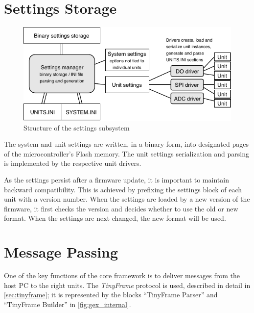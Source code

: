 \section{Settings Storage} \label{sec:settings_storage}

\begin{figure}[h]
	\centering
	\includegraphics[scale=1.2] {img/settings-storage.pdf}
	\caption{\label{fig:settings_storage}Structure of the settings subsystem}
\end{figure}

The system and unit settings are written, in a binary form, into designated pages of the microcontroller's Flash memory. The unit settings serialization and parsing is implemented by the respective unit drivers.

As the settings persist after a firmware update, it is important to maintain backward compatibility. This is achieved by prefixing the settings block of each unit with a version number. When the settings are loaded by a new version of the firmware, it first checks the version and decides whether to use the old or new format. When the settings are next changed, the new format will be used.

%


\section{Message Passing} \label{sec:message_passing}

One of the key functions of the core framework is to deliver messages from the host \gls{PC} to the right units. The \textit{TinyFrame} protocol is used, described in detail in \cref{sec:tinyframe}; it is represented by the blocks ``TinyFrame Parser'' and ``TinyFrame Builder'' in \cref{fig:gex_internal}.

